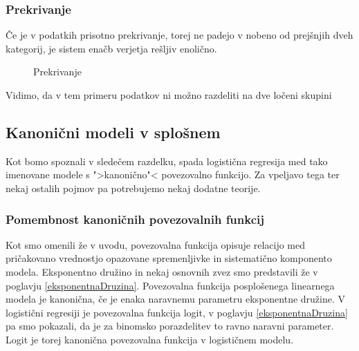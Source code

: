 \documentclass[12pt,a4paper]{amsart}
\theoremstyle{definition} %
\theoremstyle{plain} %
\begin{document}
\subsubsection{Prekrivanje}
Če je v podatkih prisotno prekrivanje, torej ne padejo v nobeno od prejšnjih dveh kategorij, je sistem enačb verjetja rešljiv enolično.
\begin{center}
    \begin{figure}[h!]
    \caption{Prekrivanje}
\end{figure}
\end{center}
Vidimo, da v tem primeru podatkov ni možno razdeliti na dve ločeni skupini

\subsection{Kanonični modeli v splošnem}
Kot bomo spoznali v sledečem razdelku, spada logistična regresija med tako imenovane modele s ">kanonično"< povezovalno funkcijo. 
Za vpeljavo tega ter nekaj ostalih pojmov pa potrebujemo nekaj dodatne teorije.

\subsubsection{Pomembnost kanoničnih povezovalnih funkcij}\label{kan}
Kot smo omenili že v uvodu, povezovalna funkcija opisuje relacijo med pričakovano vrednostjo opazovane spremenljivke in
sistematično komponento modela. Eksponentno družino in nekaj osnovnih zvez smo predstavili že v poglavju \ref{eksponentnaDruzina}.
Povezovalna funkcija posplošenega linearnega modela je kanonična, če je enaka naravnemu parametru eksponentne družine. V logistični regresiji je povezovalna funkcija logit,
v poglavju \ref{eksponentnaDruzina} pa smo pokazali, da je za binomsko porazdelitev to ravno naravni parameter. Logit je torej kanonična povezovalna funkcija v logističnem modelu.
\end{document}
